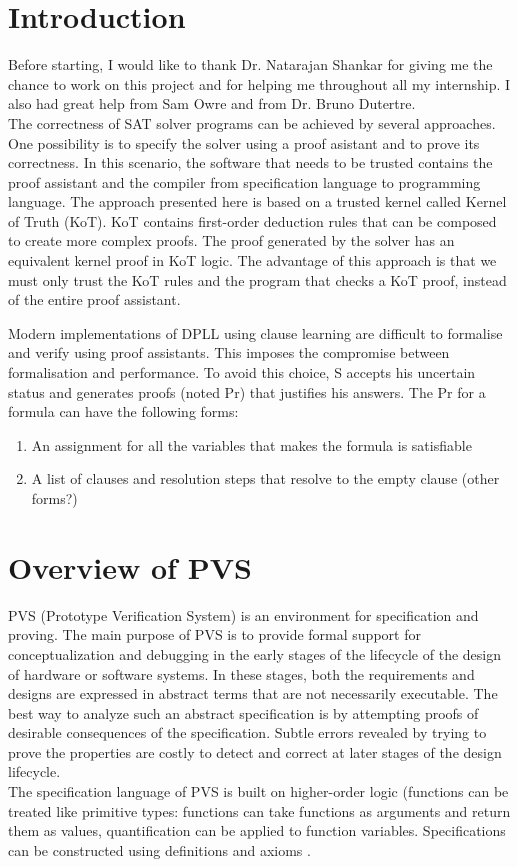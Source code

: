 \documentclass[a4paper,12pt]{article}
\begin{document}
\section{Introduction}
Before starting, I would like to thank Dr. Natarajan Shankar for giving me the chance to work on this project and for helping me
throughout all my internship. I also had great help from Sam Owre and from Dr. Bruno Dutertre. \\
The correctness of SAT solver programs can be achieved by several approaches. One possibility is to specify the solver using
a proof asistant and to prove its correctness. In this scenario, the software that needs to be trusted contains the 
proof assistant and the compiler from specification language to programming language. The approach presented here 
is based on a trusted kernel called Kernel of Truth (KoT). KoT contains first-order deduction rules that can be composed to 
create more complex proofs. The proof generated by the solver has an equivalent kernel proof in KoT logic. The 
advantage of this approach is that we must only trust the KoT rules and the program that checks a KoT proof, instead of the entire
proof assistant.

Modern implementations of DPLL using clause learning are difficult to formalise and verify 
using proof assistants. This imposes the compromise between formalisation and performance. To avoid this choice, S
 accepts his uncertain status and generates proofs (noted Pr) that justifies his answers. 
The Pr for a formula can have the following forms:

\begin{enumerate}
\item An assignment for all the variables that makes the formula is satisfiable 
\item A list of clauses and resolution steps that resolve to the empty clause (other forms?)
\end{enumerate}

\section{Overview of PVS}
PVS  (Prototype Verification System) is an environment for specification and proving. The main purpose of PVS is to provide 
formal support for conceptualization and debugging in the early stages of the lifecycle of the design
of hardware or software systems. In these stages, both the requirements and designs are expressed in abstract
terms that are not necessarily executable. The best way to analyze such an abstract specification is by 
attempting proofs of desirable consequences of the specification. Subtle errors revealed by trying to prove
the properties are costly to detect and correct at later stages of the design lifecycle.
\\The specification language of PVS is built on higher-order logic (functions can be treated like
primitive types: functions can take functions as arguments and return them as values, quantification
can be applied to function variables. Specifications can be constructed using definitions and axioms \cite{prover}.
\end{document}
